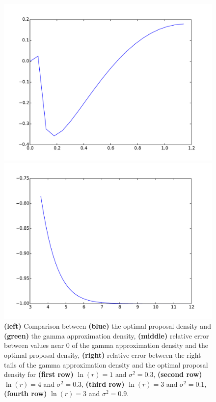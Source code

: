 \documentclass{article}
\begin{document}
\begin{figure}[htb]
\begin{minipage}{.3\textwidth}
	\end{minipage}
	\begin{minipage}{.3\textwidth}
		\centering
		\includegraphics[width=0.97\linewidth]{bootstrap-filter/relative_beginning_complex_3_9.pdf}
	\end{minipage}
	\begin{minipage}{.3\textwidth}
		\centering
		\includegraphics[width=0.97\linewidth]{bootstrap-filter/relative_tail_complex_3_9.pdf}
	\end{minipage}
	\caption{\textbf{(left)} Comparison between \textbf{(blue)} the optimal proposal density and \textbf{(green)} the gamma approximation density, \textbf{(middle)} relative error between values near 0 of the gamma approximation density and the optimal proposal density, \textbf{(right)} relative error between the right tails of the gamma approximation density and the optimal proposal density for \textbf{(first row)} $\ln(r)=1$ and $\sigma^2 = 0.3$, \textbf{(second row)} $\ln(r)=4$ and $\sigma^2 = 0.3$, \textbf{(third row)} $\ln(r)=3$ and $\sigma^2 = 0.1$, \textbf{(fourth row)} $\ln(r)=3$ and $\sigma^2 = 0.9$.}
	\label{fig:movingcomplex}
\end{figure}
\end{document}
